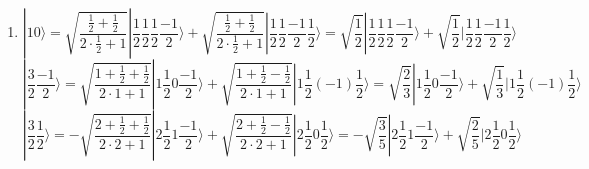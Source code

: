 \begin{enumerate}
        \begin{align*}
            s(s+1)A = (s_2(s_2+1)+m+\frac{1}{4})A + \sqrt{s_2(s_2+1)-(m-\frac{1}{2})(m+\frac{1}{2})}B
        \end{align*}
        \begin{align*}
            s(s+1)B = \sqrt{s_2(s_2+1)-(m-\frac{1}{2})(m+\frac{1}{2})}A + (s_2(s_2+1)-m+\frac{1}{4})B
        \end{align*}
        Let $a=s_2(s_2+1)+\frac{1}{4},$ $b=\sqrt{s_2(s_2+1)-(m-\frac{1}{2})(m+\frac{1}{2})},$ then
        $$
        \frac{A}{B} = \frac{(a+m)A + bB}{bA + (a-m)B}
        $$
        $$
        b(\frac{A}{B})^2 + (-2m)\frac{A}{B} - b= 0
        $$
        $$
        \frac{A}{B} = \frac{2m\pm\sqrt{4m^2+4b^2}}{2b}
    =   \frac{m\pm\sqrt{s_2(s_2+1)+\frac{1}{4}}}{\sqrt{s_2(s_2+1)-m^2+\frac{1}{4}}} = \frac{m\pm(s_2+\frac{1}{2})}{\sqrt{(s_2+\frac{1}{2})^2-m^2}}
        $$
If plus, then 
$$
\frac{A}{B} = \sqrt{\frac{s_2+\frac{1}{2}+m}{s_2+\frac{1}{2}-m}},
$$
if minus, then 
$$
\frac{A}{B} = -\sqrt{\frac{s_2+\frac{1}{2}-m}{s_2+\frac{1}{2}+m}}.
$$
Combine with the fact that $A^2+B^2=1,$ we have 
$$
B = \pm\sqrt{\frac{s_2+\frac{1}{2}\mp m}{2s_2+1}}, 
A = \sqrt{\frac{s_2+\frac{1}{2}\pm m}{2s_2+1}}.
$$
\item 
    $$
    |10\rangle =
    \sqrt{\frac{\frac{1}{2}+\frac{1}{2}}{2\cdot 
    \frac{1}{2} + 1}}
    |\frac{1}{2}\frac{1}{2}
    \frac{1}{2}\frac{-1}{2}\rangle
    +
    \sqrt{\frac{\frac{1}{2}+\frac{1}{2}}{2\cdot 
    \frac{1}{2} + 1}}
    |\frac{1}{2}\frac{1}{2}
    \frac{-1}{2}\frac{1}{2}\rangle
    =
    \sqrt{\frac{1}{2}}
   |\frac{1}{2}\frac{1}{2}
    \frac{1}{2}\frac{-1}{2}\rangle
    +
    \sqrt{\frac{1}{2}}
    |\frac{1}{2}\frac{1}{2}
    \frac{-1}{2}\frac{1}{2}\rangle
    $$
    $$
    |\frac{3}{2}\frac{-1}{2}\rangle =
    \sqrt{\frac{1+\frac{1}{2}+\frac{1}{2}}{2\cdot 
    1 + 1}}
    |1\frac{1}{2}
    0\frac{-1}{2}\rangle
    +
    \sqrt{\frac{1+\frac{1}{2}-\frac{1}{2}}{2\cdot 
    1 + 1}}
    |1\frac{1}{2}
    (-1)\frac{1}{2}\rangle
    =
    \sqrt{\frac{2}{3}}
    |1\frac{1}{2}
    0\frac{-1}{2}\rangle
    +
    \sqrt{\frac{1}{3}}
    |1\frac{1}{2}
    (-1)\frac{1}{2}\rangle
    $$
    $$
    |\frac{3}{2}\frac{1}{2}\rangle =
    -\sqrt{\frac{2+\frac{1}{2}+\frac{1}{2}}{2\cdot 
    2 + 1}}
    |2\frac{1}{2}
    1\frac{-1}{2}\rangle
    +
    \sqrt{\frac{2+\frac{1}{2}-\frac{1}{2}}
    {2\cdot 2 + 1}}
    |2\frac{1}{2}
    0\frac{1}{2}\rangle
    =
    -\sqrt{\frac{3}{5}}
    |2\frac{1}{2}
    1\frac{-1}{2}\rangle
    +
    \sqrt{\frac{2}{5}}
    |2\frac{1}{2}
    0\frac{1}{2}\rangle
    $$
\end{enumerate}
